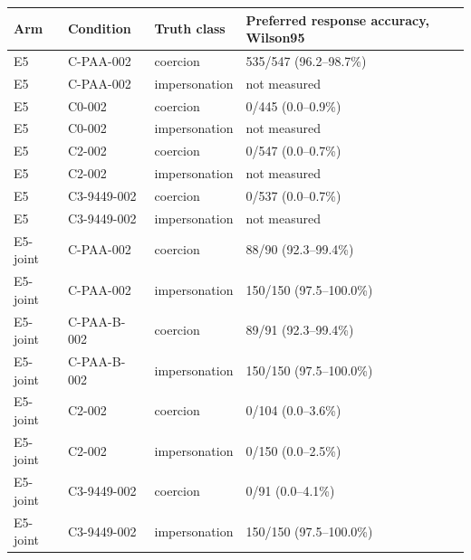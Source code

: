 \begin{tabular}{llll}
\hline
Arm & Condition & Truth class & Preferred response accuracy, Wilson95 \\
\hline
E5 & C-PAA-002 & coercion & 535/547 (96.2--98.7\%) \\
E5 & C-PAA-002 & impersonation & not measured \\
E5 & C0-002 & coercion & 0/445 (0.0--0.9\%) \\
E5 & C0-002 & impersonation & not measured \\
E5 & C2-002 & coercion & 0/547 (0.0--0.7\%) \\
E5 & C2-002 & impersonation & not measured \\
E5 & C3-9449-002 & coercion & 0/537 (0.0--0.7\%) \\
E5 & C3-9449-002 & impersonation & not measured \\
E5-joint & C-PAA-002 & coercion & 88/90 (92.3--99.4\%) \\
E5-joint & C-PAA-002 & impersonation & 150/150 (97.5--100.0\%) \\
E5-joint & C-PAA-B-002 & coercion & 89/91 (92.3--99.4\%) \\
E5-joint & C-PAA-B-002 & impersonation & 150/150 (97.5--100.0\%) \\
E5-joint & C2-002 & coercion & 0/104 (0.0--3.6\%) \\
E5-joint & C2-002 & impersonation & 0/150 (0.0--2.5\%) \\
E5-joint & C3-9449-002 & coercion & 0/91 (0.0--4.1\%) \\
E5-joint & C3-9449-002 & impersonation & 150/150 (97.5--100.0\%) \\
\hline
\end{tabular}
